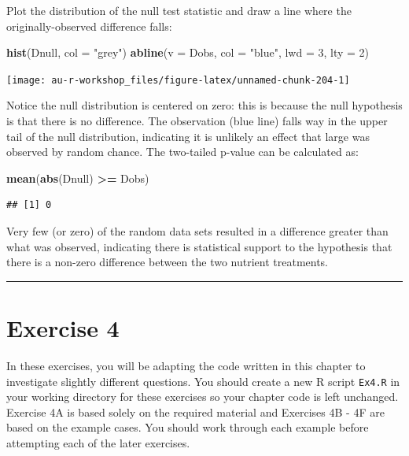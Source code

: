 \documentclass[]{book}
\newenvironment{Shaded}{\begin{snugshade}}{\end{snugshade}}
\newcommand{\KeywordTok}[1]{\textcolor[rgb]{0.13,0.29,0.53}{\textbf{#1}}}
\newcommand{\DataTypeTok}[1]{\textcolor[rgb]{0.13,0.29,0.53}{#1}}
\newcommand{\DecValTok}[1]{\textcolor[rgb]{0.00,0.00,0.81}{#1}}
\newcommand{\StringTok}[1]{\textcolor[rgb]{0.31,0.60,0.02}{#1}}
\newcommand{\OperatorTok}[1]{\textcolor[rgb]{0.81,0.36,0.00}{\textbf{#1}}}
\newcommand{\NormalTok}[1]{#1}
\theoremstyle{definition}
\theoremstyle{definition}
\theoremstyle{definition}
\theoremstyle{remark}
\begin{document}
Plot the distribution of the null test statistic and draw a line where
the originally-observed difference falls:

\begin{Shaded}
\begin{Highlighting}[]
\KeywordTok{hist}\NormalTok{(Dnull, }\DataTypeTok{col =} \StringTok{"grey"}\NormalTok{)}
\KeywordTok{abline}\NormalTok{(}\DataTypeTok{v =}\NormalTok{ Dobs, }\DataTypeTok{col =} \StringTok{"blue"}\NormalTok{, }\DataTypeTok{lwd =} \DecValTok{3}\NormalTok{, }\DataTypeTok{lty =} \DecValTok{2}\NormalTok{)}
\end{Highlighting}
\end{Shaded}

\begin{center}\texttt{[image: au-r-workshop\_files/figure-latex/unnamed-chunk-204-1]} \end{center}

Notice the null distribution is centered on zero: this is because the
null hypothesis is that there is no difference. The observation (blue
line) falls way in the upper tail of the null distribution, indicating
it is unlikely an effect that large was observed by random chance. The
two-tailed p-value can be calculated as:

\begin{Shaded}
\begin{Highlighting}[]
\KeywordTok{mean}\NormalTok{(}\KeywordTok{abs}\NormalTok{(Dnull) }\OperatorTok{>=}\StringTok{ }\NormalTok{Dobs)}
\end{Highlighting}
\end{Shaded}

\begin{verbatim}
## [1] 0
\end{verbatim}

Very few (or zero) of the random data sets resulted in a difference
greater than what was observed, indicating there is statistical support
to the hypothesis that there is a non-zero difference between the two
nutrient treatments.

\begin{center}\rule{0.5\linewidth}{\linethickness}\end{center}

\section{Exercise 4}\label{exercise-4}

In these exercises, you will be adapting the code written in this
chapter to investigate slightly different questions. You should create a
new R script \texttt{Ex4.R} in your working directory for these
exercises so your chapter code is left unchanged. Exercise 4A is based
solely on the required material and Exercises 4B - 4F are based on the
example cases. You should work through each example before attempting
each of the later exercises.
\end{document}
